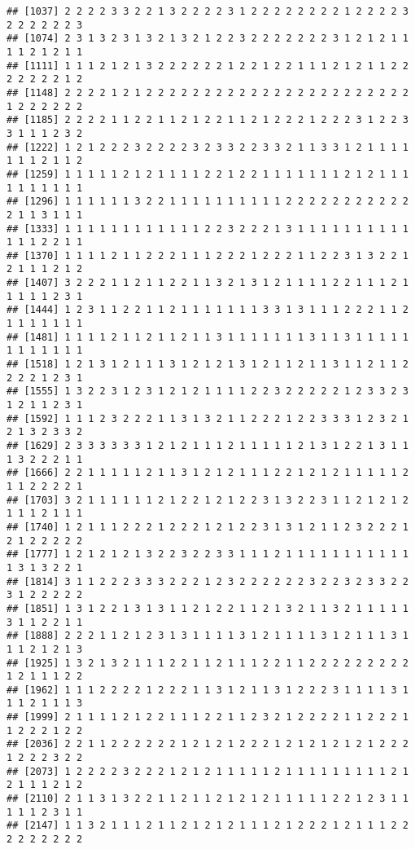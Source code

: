 \documentclass[
]{article}
\begin{document}
\begin{verbatim}
## [1037] 2 2 2 2 3 3 2 2 1 3 2 2 2 2 3 1 2 2 2 2 2 2 2 2 1 2 2 2 2 3 2 2 2 2 2 2 3
## [1074] 2 3 1 3 2 3 1 3 2 1 3 2 1 2 2 3 2 2 2 2 2 2 2 3 1 2 1 2 1 1 1 1 2 1 2 1 1
## [1111] 1 1 1 2 1 2 1 3 2 2 2 2 2 2 1 2 2 1 2 2 1 1 1 2 1 2 1 1 2 2 2 2 2 2 2 1 2
## [1148] 2 2 2 2 1 2 1 2 2 2 2 2 2 2 2 2 2 2 2 2 2 2 2 2 2 2 2 2 2 2 1 2 2 2 2 2 2
## [1185] 2 2 2 2 1 1 2 2 1 1 2 1 2 2 1 1 2 1 2 2 2 1 2 2 2 3 1 2 2 3 3 1 1 1 2 3 2
## [1222] 1 2 1 2 2 2 3 2 2 2 2 3 2 3 3 2 2 3 3 2 1 1 3 3 1 2 1 1 1 1 1 1 1 2 1 1 2
## [1259] 1 1 1 1 1 2 1 2 1 1 1 1 2 2 1 2 2 1 1 1 1 1 1 1 2 1 2 1 1 1 1 1 1 1 1 1 1
## [1296] 1 1 1 1 1 1 3 2 2 1 1 1 1 1 1 1 1 1 1 2 2 2 2 2 2 2 2 2 2 2 2 1 1 3 1 1 1
## [1333] 1 1 1 1 1 1 1 1 1 1 1 1 2 2 3 2 2 2 1 3 1 1 1 1 1 1 1 1 1 1 1 1 1 2 2 1 1
## [1370] 1 1 1 1 2 1 1 2 2 2 1 1 1 2 2 2 1 2 2 2 1 1 2 2 3 1 3 2 2 1 2 1 1 1 2 1 2
## [1407] 3 2 2 2 1 1 2 1 1 2 2 1 1 3 2 1 3 1 2 1 1 1 1 2 2 1 1 1 2 1 1 1 1 1 2 3 1
## [1444] 1 2 3 1 1 2 2 1 1 2 1 1 1 1 1 1 1 3 3 1 3 1 1 1 2 2 2 1 1 2 1 1 1 1 1 1 1
## [1481] 1 1 1 1 2 1 1 2 1 1 2 1 1 3 1 1 1 1 1 1 1 3 1 1 3 1 1 1 1 1 1 1 1 1 1 1 1
## [1518] 1 2 1 3 1 2 1 1 1 3 1 2 1 2 1 3 1 2 1 1 2 1 1 3 1 1 2 1 1 2 2 2 2 1 2 3 1
## [1555] 1 3 2 2 3 1 2 3 1 2 1 2 1 1 1 1 2 2 3 2 2 2 2 2 1 2 3 3 2 3 1 2 1 1 2 3 1
## [1592] 1 1 1 2 3 2 2 2 1 1 3 1 3 2 1 1 2 2 2 1 2 2 3 3 3 1 2 3 2 1 2 1 3 2 3 3 2
## [1629] 2 3 3 3 3 3 3 1 2 1 2 1 1 1 2 1 1 1 1 1 2 1 3 1 2 2 1 3 1 1 1 3 2 2 2 1 1
## [1666] 2 2 1 1 1 1 1 2 1 1 3 1 2 1 2 1 1 1 2 2 1 2 1 2 1 1 1 1 1 2 1 1 2 2 2 2 1
## [1703] 3 2 1 1 1 1 1 1 2 1 2 2 1 2 1 2 2 3 1 3 2 2 3 1 1 2 1 2 1 2 1 1 1 2 1 1 1
## [1740] 1 2 1 1 1 2 2 2 1 2 2 2 1 2 1 2 2 3 1 3 1 2 1 1 2 3 2 2 2 1 2 1 2 2 2 2 2
## [1777] 1 2 1 2 1 2 1 3 2 2 3 2 2 3 3 1 1 1 2 1 1 1 1 1 1 1 1 1 1 1 1 3 1 3 2 2 1
## [1814] 3 1 1 2 2 2 3 3 3 2 2 2 1 2 3 2 2 2 2 2 2 3 2 2 3 2 3 3 2 2 3 1 2 2 2 2 2
## [1851] 1 3 1 2 2 1 3 1 3 1 1 2 1 2 2 1 1 2 1 3 2 1 1 3 2 1 1 1 1 1 3 1 1 2 2 1 1
## [1888] 2 2 2 1 1 2 1 2 3 1 3 1 1 1 1 3 1 2 1 1 1 1 3 1 2 1 1 1 3 1 1 1 2 1 2 1 3
## [1925] 1 3 2 1 3 2 1 1 1 2 2 1 1 2 1 1 1 2 2 1 1 2 2 2 2 2 2 2 2 2 1 2 1 1 1 2 2
## [1962] 1 1 1 2 2 2 2 1 2 2 2 1 1 3 1 2 1 1 3 1 2 2 2 3 1 1 1 1 3 1 1 1 2 1 1 1 3
## [1999] 2 1 1 1 1 2 1 2 2 1 1 1 2 2 1 1 2 3 2 1 2 2 2 2 1 1 2 2 2 1 1 2 2 2 1 2 2
## [2036] 2 2 1 1 2 2 2 2 2 2 1 2 1 2 1 2 2 2 1 2 1 2 1 2 1 2 1 2 2 2 1 2 2 2 3 2 2
## [2073] 1 2 2 2 2 3 2 2 2 1 2 1 2 1 1 1 1 1 2 1 1 1 1 1 1 1 1 1 2 1 2 1 1 1 2 1 2
## [2110] 2 1 1 3 1 3 2 2 1 1 2 1 1 2 1 2 1 2 1 1 1 1 1 2 2 1 2 3 1 1 1 1 1 2 3 1 1
## [2147] 1 1 3 2 1 1 1 2 1 1 2 1 2 1 2 1 1 1 2 1 2 2 2 1 2 1 1 1 2 2 2 2 2 2 2 2 2

\end{verbatim}
\end{document}
